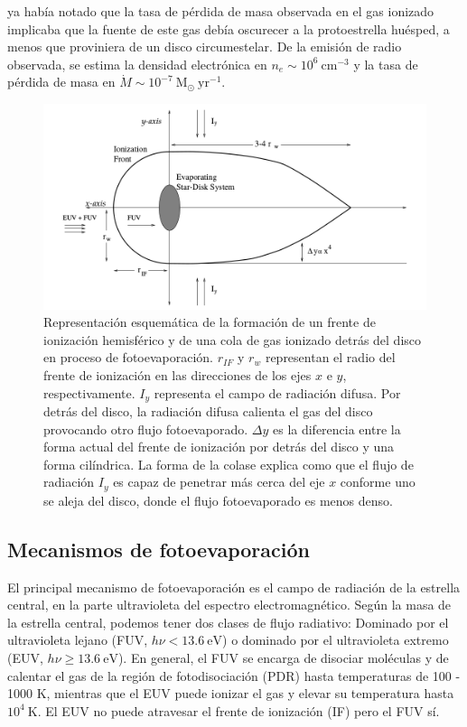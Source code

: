 \citet{churchwell:1987} ya había notado que la tasa de pérdida de masa observada
en el gas ionizado implicaba que la fuente de este gas debía oscurecer a la
protoestrella huésped, a menos que proviniera de un disco circumestelar. De la
emisión de radio observada, se estima la densidad electrónica en
$n_e \sim 10^6~\mathrm{cm^{-3}}$ y la tasa de pérdida de masa en
$\dot{M} \sim 10^{-7}~\mathrm{M_\odot~yr^{-1}}$.

\begin{figure}
  \includegraphics[width=0.8\linewidth]{./Figures/Johnstone-shape}
  \caption{Representación esquemática de la formación de un frente de ionización
    hemisférico y de una cola de gas ionizado detrás del disco en proceso de
    fotoevaporación. $r_{IF}$ y $r_w$ representan el radio del frente de ionización en las direcciones de los ejes $x$ e $y$, respectivamente. $I_y$ representa el campo de radiación difusa. Por detrás del disco, la radiación difusa calienta el gas del disco provocando otro flujo fotoevaporado. $\Delta y$ es la diferencia entre la forma actual del frente de ionización por detrás del disco y una forma cilíndrica. La forma de la colase explica como que el flujo de radiación $I_y$ es capaz de penetrar más cerca del eje $x$ conforme uno se aleja del disco, donde el flujo fotoevaporado es menos denso.}
    \label{fig:prop-shape}
\end{figure}


\subsection{Mecanismos de fotoevaporación \citep{Johnstone:1998}}

El principal mecanismo de fotoevaporación es el campo de radiación de la
estrella central, en la parte ultravioleta del espectro electromagnético. Según la masa de la estrella central, podemos tener dos clases de flujo radiativo: Dominado por el ultravioleta lejano (FUV, $h\nu < 13.6~\mathrm{eV}$) o dominado por el ultravioleta extremo (EUV, $h\nu \geq 13.6~\mathrm{eV}$). En general, el FUV se encarga de disociar moléculas y de calentar el gas de la región de fotodisociación (PDR) hasta temperaturas de 100 - 1000 K, mientras que el EUV puede ionizar el gas y elevar su temperatura hasta $10^4~\mathrm{K}$. El EUV no puede atravesar el frente de ionización (IF) pero el FUV sí.

